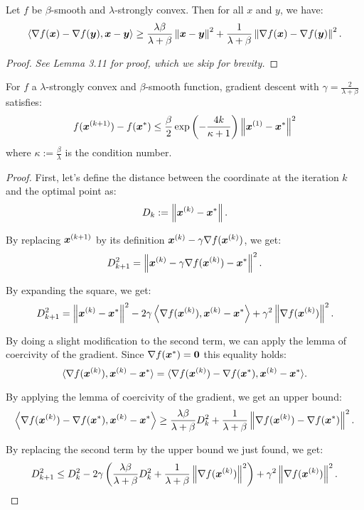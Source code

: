 \documentclass{article}
\begin{document}
{\begin{lemma} Let $f$ be $\beta$-smooth and $\lambda$-strongly convex. Then for all $x$ and $y$, we have:
\[
    \left\langle\nabla f({\bm{x}}) - \nabla f({\bm{y}}), {\bm{x}}-{\bm{y}}\right\rangle \geq \frac{\lambda\beta}{\lambda + \beta} \left\|{\bm{x}}-{\bm{y}}\right\|^2 + \frac{1}{\lambda + \beta} \left\|\nabla f({\bm{x}}) - \nabla f({\bm{y}})\right\|^2.
\]
\end{lemma}

\begin{proof}
\textit{See \cite{bubeck2015convex} Lemma 3.11 for proof, which we skip for brevity.}
\end{proof}

\begin{thm}\label{thm:str-cvx-smth}
For $f$ a $\lambda$-strongly convex and $\beta$-smooth function, gradient descent with $\gamma = \frac{2}{\lambda + \beta}$ satisfies:
\[
	f({\bm{x}}^{(k+1)}) - f({\bm{x}}^\ast) \leq \frac{\beta}{2} \exp\left( -\frac{4k}{\kappa + 1}\right) \left\|{\bm{x}}^{(1)} - {\bm{x}}^\ast\right\|^2
\]
where $\kappa := \frac{\beta}{\lambda}$ is the condition number.
\end{thm}

\begin{proof}
First, let's define the distance between the coordinate at the iteration $k$ and the optimal point as:
\[
    D_k := \left\|{\bm{x}}^{(k)} - {\bm{x}}^\ast\right\|.
\]

By replacing ${\bm{x}}^{(k+1)}$ by its definition ${\bm{x}}^{(k)} - \gamma \nabla f({\bm{x}}^{(k)})$, we get:
\[
    D_{k+1}^2 = \left\|{\bm{x}}^{(k)} - \gamma \nabla f({\bm{x}}^{(k)}) - {\bm{x}}^\ast\right\|^{2}.
\]

By expanding the square, we get:
\[
    D_{k+1}^2 = \left\|{\bm{x}}^{(k)} - {\bm{x}}^\ast\right\|^2 - 2 \gamma \left\langle\nabla f({\bm{x}}^{(k)}), {\bm{x}}^{(k)} - {\bm{x}}^\ast\right\rangle + \gamma^2 \left\|\nabla f({\bm{x}}^{(k)})\right\|^2.
\]

By doing a slight modification to the second term, we can apply the lemma of coercivity of the gradient. Since $ \nabla f({\bm{x}}^\ast) = {\bm{0}}$ this equality holds:
\[
    \langle \nabla f({\bm{x}}^{(k)}), {\bm{x}}^{(k)} - {\bm{x}}^\ast \rangle = \langle \nabla f({\bm{x}}^{(k)}) - \nabla f({\bm{x}}^\ast), {\bm{x}}^{(k)} - {\bm{x}}^\ast \rangle.
\]

By applying the lemma of coercivity of the gradient, we get an upper bound:
\[
    \left\langle\nabla f({\bm{x}}^{(k)}) - \nabla f({\bm{x}}^\ast), {\bm{x}}^{(k)} - {\bm{x}}^\ast\right\rangle \geq \frac{\lambda \beta}{\lambda + \beta} D^2_k + \frac{1}{\lambda + \beta} \left\|\nabla f({\bm{x}}^{(k)}) - \nabla f({\bm{x}}^\ast)\right\|^2.
\]

By replacing the second term by the upper bound we just found, we get:
\[
    D^2_{k+1} \leq D^2_k - 2 \gamma \left(\frac{\lambda \beta}{\lambda + \beta} D^2_k + \frac{1}{\lambda + \beta} \left\|\nabla f({\bm{x}}^{(k)})\right\|^2\right) + \gamma^2 \left\|\nabla f({\bm{x}}^{(k)})\right\|^2.
\]


\end{proof}}
\end{document}
